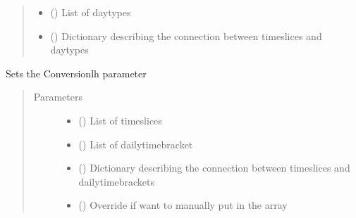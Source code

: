 \documentclass[a4paper,12pt,english]{article}
\begin{document}
\begin{fulllineitems}
\begin{fulllineitems}
\begin{quote}
\begin{description}
\begin{itemize}
\item {} 
 () \textendash{} List of daytypes

\item {} 
 () \textendash{} Dictionary describing the connection between timeslices and daytypes

\end{itemize}

\end{description}\end{quote}

\end{fulllineitems}


\begin{fulllineitems}
\label{\detokenize{GOCPI:GOCPI.CreateCases.CreateCases.set_conversion_lh}}
Sets the Conversionlh parameter
\begin{quote}\begin{description}
\item[{Parameters}] \leavevmode\begin{itemize}
\item {} 
 () \textendash{} List of timeslices

\item {} 
 () \textendash{} List of dailytimebracket

\item {} 
 () \textendash{} Dictionary describing the connection between timeslices and dailytimebrackets

\item {} 
 (\sphinxstyleliteralemphasis{\sphinxupquote{, }}) \textendash{} Override if want to manually put in the array


\end{itemize}
\end{description}
\end{quote}
\end{fulllineitems}
\end{fulllineitems}
\end{document}
